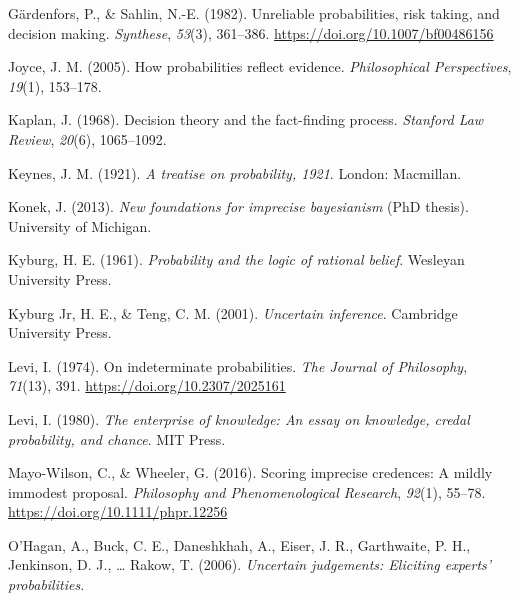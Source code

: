 \documentclass[
  10pt,
  dvipsnames,enabledeprecatedfontcommands]{scrartcl}
\newlength{\cslhangindent}
\newlength{\cslentryspacingunit} %
\newenvironment{CSLReferences}[2] %
 {%
  \setlength{\parindent}{0pt}
  \ifodd #1
  \let\oldpar\par
  \def\par{\hangindent=\cslhangindent\oldpar}
  \fi
  \setlength{\parskip}{#2\cslentryspacingunit}
 }%
 {}
\begin{document}
\begin{CSLReferences}{1}{0}
\leavevmode{}%
Gärdenfors, P., \& Sahlin, N.-E. (1982). Unreliable probabilities, risk
taking, and decision making. \emph{Synthese}, \emph{53}(3), 361--386.
\url{https://doi.org/10.1007/bf00486156}

\leavevmode{}%
Joyce, J. M. (2005). How probabilities reflect evidence.
\emph{Philosophical Perspectives}, \emph{19}(1), 153--178.

\leavevmode{}%
Kaplan, J. (1968). Decision theory and the fact-finding process.
\emph{Stanford Law Review}, \emph{20}(6), 1065--1092.

\leavevmode{}%
Keynes, J. M. (1921). \emph{A treatise on probability, 1921}. London:
Macmillan.

\leavevmode{}%
Konek, J. (2013). \emph{New foundations for imprecise bayesianism} (PhD
thesis). University of Michigan.

\leavevmode{}%
Kyburg, H. E. (1961). \emph{Probability and the logic of rational
belief}. Wesleyan University Press.

\leavevmode{}%
Kyburg Jr, H. E., \& Teng, C. M. (2001). \emph{Uncertain inference}.
Cambridge University Press.

\leavevmode{}%
Levi, I. (1974). On indeterminate probabilities. \emph{The Journal of
Philosophy}, \emph{71}(13), 391. \url{https://doi.org/10.2307/2025161}

\leavevmode{}%
Levi, I. (1980). \emph{The enterprise of knowledge: An essay on
knowledge, credal probability, and chance}. MIT Press.

\leavevmode{}%
Mayo-Wilson, C., \& Wheeler, G. (2016). Scoring imprecise credences: A
mildly immodest proposal. \emph{Philosophy and Phenomenological
Research}, \emph{92}(1), 55--78.
\url{https://doi.org/10.1111/phpr.12256}

\leavevmode{}%
O'Hagan, A., Buck, C. E., Daneshkhah, A., Eiser, J. R., Garthwaite, P.
H., Jenkinson, D. J., \ldots{} Rakow, T. (2006). \emph{Uncertain
judgements: Eliciting experts' probabilities}.


\end{CSLReferences}
\end{document}
